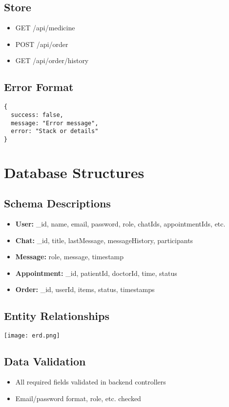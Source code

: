 \documentclass{article}
\begin{document}
\subsection{Store}
\begin{itemize}
  \item GET /api/medicine
  \item POST /api/order
  \item GET /api/order/history
\end{itemize}

\subsection{Error Format}
\begin{verbatim}
{
  success: false,
  message: "Error message",
  error: "Stack or details"
}
\end{verbatim}

\section{Database Structures}
\subsection{Schema Descriptions}
\begin{itemize}
  \item \textbf{User:} _id, name, email, password, role, chatIds, appointmentIds, etc.
  \item \textbf{Chat:} _id, title, lastMessage, messageHistory, participants
  \item \textbf{Message:} role, message, timestamp
  \item \textbf{Appointment:} _id, patientId, doctorId, time, status
  \item \textbf{Order:} _id, userId, items, status, timestamps
\end{itemize}

\subsection{Entity Relationships}
\begin{center}
  \texttt{[image: erd.png]}
\end{center}

\subsection{Data Validation}
\begin{itemize}
  \item All required fields validated in backend controllers
  \item Email/password format, role, etc. checked
\end{itemize}
\end{document}

